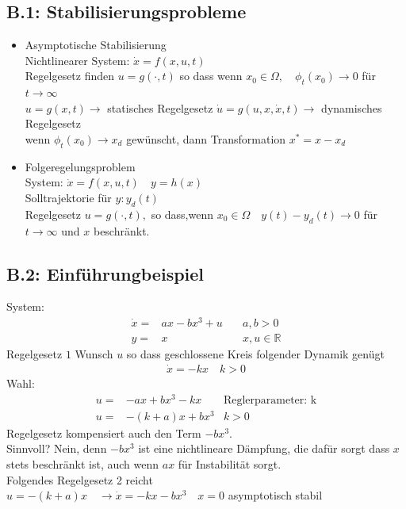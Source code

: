 \documentclass[11pt,a4paper]{article}
\begin{document}
\subsection*{\textbf{B.1:} Stabilisierungsprobleme}
\begin{itemize}
\item Asymptotische Stabilisierung\\
Nichtlinearer System: $\dot x = f(x,u,t) $ \\Regelgesetz finden $u = g(\cdot ,t)$ so dass wenn $x_0 \in \Omega, \quad \phi_t(x_0) \rightarrow 0$ für $t\to \infty$\\
$u = g(x,t) \rightarrow $ statisches Regelgesetz $\dot u = g(u,x,\dot x,t) \rightarrow $ dynamisches Regelgesetz \\
wenn $\phi_t(x_0) \rightarrow x_d$ gewünscht, dann Transformation $x^* = x-x_d$
\item Folgeregelungsproblem\\
System: $\dot x = f(x,u,t) \quad y= h(x) $\\
Solltrajektorie für $y: y_d(t)$\\
Regelgesetz $u = g(\cdot , t) ,$ so dass,wenn $x_0 \in \Omega \quad y(t) - y_d(t) \rightarrow 0 $ für $t\to \infty$ und $x$ beschränkt.
\end{itemize}
\subsection*{\textbf{B.2: }Einführungbeispiel}
System: \begin{align*}\dot x =& ax - bx^3 + u \quad &a,b>0\\
y=&x &x,u \in \mathbb{R}
\end{align*}
Regelgesetz $1$ Wunsch $u$ so dass geschlossene Kreis folgender Dynamik genügt
\begin{align*}
\dot x = - k x\quad k>0
\end{align*}
Wahl: 
\begin{align*}
u =& - a x + b x^3-kx \quad &\text{Reglerparameter: k}\\
u=& - (k+a)x + b x^3 &k>0
\end{align*}
Regelgesetz kompensiert auch den Term $-bx^3$.\\
Sinnvoll? Nein, denn $-bx^3$ ist eine nichtlineare Dämpfung, die dafür sorgt dass $x$ stets beschränkt ist, auch wenn $ax$ für Instabilität sorgt.\\
Folgendes Regelgesetz 2 reicht\\
$u = - (k+a)x \quad \rightarrow \dot x =-kx - bx^3 \quad x=0 $ asymptotisch stabil
\end{document}
